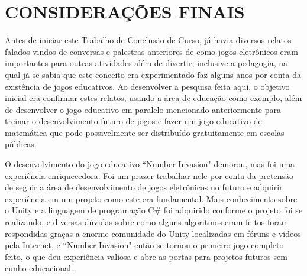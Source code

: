 \chapter{\uppercase{Considerações finais}}
\label{conclusao}









 Antes de iniciar este Trabalho de Conclusão de Curso, já havia diversos relatos falados vindos de conversas e palestras anteriores de como jogos eletrônicos eram importantes para outras atividades além de divertir, inclusive a pedagogia, na qual já se sabia que este conceito era experimentado faz alguns anos por conta da existência de jogos educativos. Ao desenvolver a pesquisa feita aqui, o objetivo inicial era confirmar estes relatos, usando a área de educação como exemplo, além de desenvolver o jogo educativo em paralelo mencionado anteriormente para treinar o desenvolvimento futuro de jogos e fazer um jogo educativo de matemática que pode possivelmente ser distribuído gratuitamente em escolas públicas.
 
 O desenvolvimento do jogo educativo ``Number Invasion" demorou, mas foi uma experiência enriquecedora. Foi um prazer trabalhar nele por conta da pretensão de seguir a área de desenvolvimento de jogos eletrônicos no futuro e adquirir experiência em um projeto como este era fundamental. Mais conhecimento sobre o Unity e a linguagem de programação C\# foi adquirido conforme o projeto foi se realizando, e diversas dúvidas sobre como alguns algoritmos eram feitos foram respondidas graças a enorme comunidade do Unity localizadas em fóruns e vídeos pela Internet, e ``Number Invasion" então se tornou o primeiro jogo completo feito, o que deu experiência valiosa e abre as portas para projetos futuros sem cunho educacional.
 
